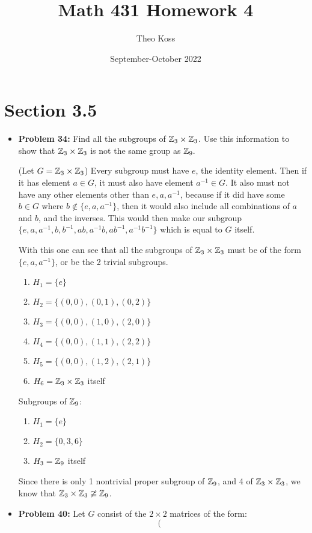 \documentclass[a4paper,12pt]{extarticle}
\title{Math 431 Homework 4}
\author{Theo Koss}
\date{September-October 2022}
\theoremstyle{definition}
\begin{document}
    \maketitle
\section*{Section 3.5}
\begin{itemize}
    \item \textbf{Problem 34:} Find all the subgroups of $\Z_3\times\Z_3$. Use this information to show that $\Z_3\times\Z_3$ is not the same group as $\Z_9.$\begin{remark}{(Let $G=\Z_3\times\Z_3$) Every subgroup must have $e$, the identity element. Then if it has element $a\in G$, it must also have element $a^{-1}\in G$. It also must not have any other elements other than $e,a,a^{-1}$, because if it did have some $b\in G$ where $b\notin\{e,a,a^{-1}\}$, then it would also include all combinations of $a$ and $b$, and the inverses. This would then make our subgroup $\{e,a,a^{-1},b,b^{-1},ab,a^{-1}b,ab^{-1},a^{-1}b^{-1}\}$ which is equal to $G$ itself.}\end{remark} With this one can see that all the subgroups of $\Z_3\times\Z_3$ must be of the form $\{e,a,a^{-1}\}$, or be the 2 trivial subgroups.\begin{enumerate}
        \item $H_1=\{e\}$
        \item $H_2=\{(0,0),(0,1),(0,2)\}$
        \item $H_3=\{(0,0),(1,0),(2,0)\}$
        \item $H_4=\{(0,0),(1,1),(2,2)\}$
        \item $H_5=\{(0,0),(1,2),(2,1)\}$
        \item $H_6=\Z_3\times\Z_3$ itself
    \end{enumerate}
    Subgroups of $\Z_9$:\begin{enumerate}
        \item $H_1=\{e\}$
        \item $H_2=\{0,3,6\}$
        \item $H_3=\Z_9$ itself
    \end{enumerate}Since there is only 1 nontrivial proper subgroup of $\Z_9$, and 4 of $\Z_3\times\Z_3$, we know that $\Z_3\times\Z_3\ncong\Z_9$.
    \item \textbf{Problem 40:} Let $G$ consist of the $2\times2$ matrices of the form:$$\left(\begin{array}{cc}

\end{array}$$
\end{itemize}
\end{document}
